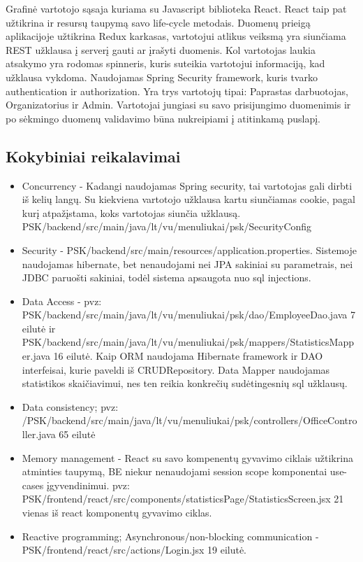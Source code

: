 \documentclass{VUMIFInfKursinis}
\begin{document}
\begin{flushleft}
Grafinė vartotojo sąsaja kuriama su Javascript biblioteka React. React taip pat užtikrina ir resursų taupymą savo life-cycle metodais. Duomenų prieigą aplikacijoje užtikrina Redux karkasas, vartotojui atlikus veiksmą yra siunčiama REST užklausa į serverį gauti ar įrašyti duomenis. Kol vartotojas laukia atsakymo yra rodomas spinneris, kuris suteikia vartotojui informaciją, kad užklausa vykdoma. Naudojamas Spring Security framework, kuris tvarko authentication ir authorization. Yra trys vartotojų tipai: Paprastas darbuotojas, Organizatorius ir Admin. Vartotojai jungiasi su savo prisijungimo duomenimis ir po sėkmingo duomenų validavimo būna nukreipiami į atitinkamą puslapį.
\subsection{Kokybiniai reikalavimai}
\begin{itemize}
	\item{Concurrency -  Kadangi naudojamas Spring security, tai vartotojas gali dirbti iš kelių langų. Su kiekviena vartotojo užklausa kartu siunčiamas cookie, pagal kurį atpažįstama, koks vartotojas siunčia užklausą.  PSK/backend/src/main/java/lt/vu/menuliukai/psk/SecurityConfig}
	\item{Security - PSK/backend/src/main/resources/application.properties. Sistemoje naudojamas hibernate, bet nenaudojami nei JPA sakiniai su parametrais, nei JDBC paruošti sakiniai, todėl sistema apsaugota nuo sql injections. }
  \item{Data Access - pvz: PSK/backend/src/main/java/lt/vu/menuliukai/psk/dao/EmployeeDao.java 7 eilutė ir PSK/backend/src/main/java/lt/vu/menuliukai/psk/mappers/StatisticsMapper.java 16 eilutė.
  Kaip ORM naudojama Hibernate framework ir DAO interfeisai, kurie paveldi iš CRUDRepository. Data Mapper naudojamas statistikos skaičiavimui, nes ten reikia konkrečių sudėtingesnių sql užklausų.}
  \item{Data consistency; \linebreak
  pvz: /PSK/backend/src/main/java/lt/vu/menuliukai/psk/controllers/OfficeController.java 65 eilutė}
	\item{Memory management - React su savo kompenentų gyvavimo ciklais užtikrina atminties taupymą, BE niekur nenaudojami session scope komponentai use-cases įgyvendinimui. pvz: PSK/frontend/react/src/components/statisticsPage/StatisticsScreen.jsx 21 vienas iš react komponentų gyvavimo ciklas.}
	\item{Reactive programming; Asynchronous/non-blocking communication - PSK/frontend/react/src/actions/Login.jsx 19 eilutė.}

\end{itemize}
\end{flushleft}
\end{document}
